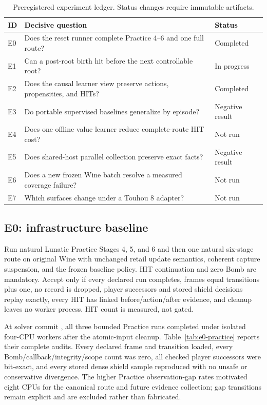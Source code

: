 \documentclass[11pt]{article}
\newcommand{\progressstatus}{\textcolor{blue!70!black}{In progress}}
\newcommand{\completedstatus}{\textcolor{green!45!black}{Completed}}
\newcommand{\negativestatus}{\textcolor{orange!80!black}{Negative result}}
\newcommand{\notrunstatus}{\textcolor{red!70!black}{Not run}}
\begin{document}
\begin{table}[H]
\centering
\small
\begin{tabular}{@{}lll@{}}
\toprule
ID & Decisive question & Status \\
\midrule
E0 & Does the reset runner complete Practice 4--6 and one full route? & \completedstatus \\
E1 & Can a post-root birth hit before the next controllable root? & \progressstatus \\
E2 & Does the causal learner view preserve actions, propensities, and HITs? & \completedstatus \\
E3 & Do portable supervised baselines generalize by episode? & \negativestatus \\
E4 & Does one offline value learner reduce complete-route HIT cost? & \notrunstatus \\
E5 & Does shared-host parallel collection preserve exact facts? & \negativestatus \\
E6 & Does a new frozen Wine batch resolve a measured coverage failure? & \notrunstatus \\
E7 & Which surfaces change under a Touhou 8 adapter? & \notrunstatus \\
\bottomrule
\end{tabular}
\caption{Preregistered experiment ledger.  Status changes require immutable artifacts.}
\label{tab:ledger}
\end{table}

\subsection{E0: infrastructure baseline}

Run natural Lunatic Practice Stages 4, 5, and 6 and then one natural six-stage
route on original Wine with unchanged retail update semantics, coherent capture
suspension, and the frozen baseline policy.  HIT
continuation and zero Bomb are mandatory.  Accept only if every declared run
completes, frames equal transitions plus one, no record is dropped, player
successors and stored shield decisions replay exactly, every HIT has linked
before/action/after evidence, and cleanup leaves no worker process.  HIT count
is measured, not gated.

At solver commit
{\footnotesize{}}, all three bounded
Practice runs completed under isolated four-CPU workers after the atomic-input
cleanup.  Table~\ref{tab:e0-practice} reports their complete audits.  Every
declared frame and transition loaded, every Bomb/callback/integrity/scope count
was zero, all checked player successors were bit-exact, and every stored dense
shield sample reproduced with no unsafe or conservative divergence.  The
higher Practice observation-gap rates motivated eight CPUs for the canonical
route and future evidence collection; gap transitions remain explicit and are
excluded rather than fabricated.
\end{document}
